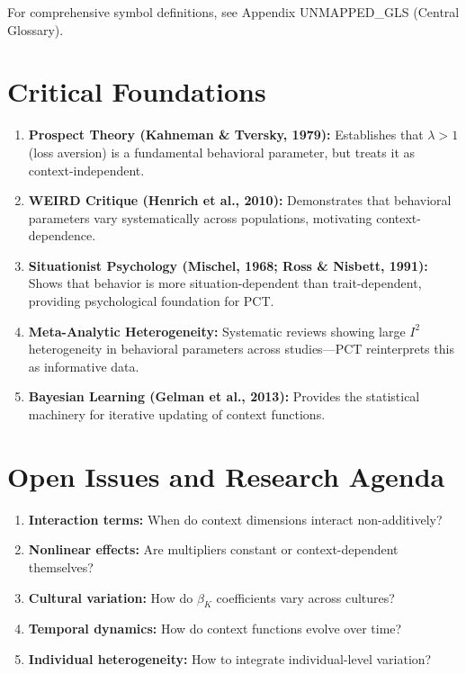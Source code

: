 For comprehensive symbol definitions, see Appendix UNMAPPED_GLS (Central Glossary).



\section{Critical Foundations}
\label{sec:pct-foundations}

\begin{enumerate}
    \item \textbf{Prospect Theory (Kahneman \& Tversky, 1979):} Establishes that
    $\lambda > 1$ (loss aversion) is a fundamental behavioral parameter, but treats
    it as context-independent.

    \item \textbf{WEIRD Critique (Henrich et al., 2010):} Demonstrates that behavioral
    parameters vary systematically across populations, motivating context-dependence.

    \item \textbf{Situationist Psychology (Mischel, 1968; Ross \& Nisbett, 1991):}
    Shows that behavior is more situation-dependent than trait-dependent, providing
    psychological foundation for PCT.

    \item \textbf{Meta-Analytic Heterogeneity:} Systematic reviews showing large
    $I^2$ heterogeneity in behavioral parameters across studies---PCT reinterprets
    this as informative data.

    \item \textbf{Bayesian Learning (Gelman et al., 2013):} Provides the statistical
    machinery for iterative updating of context functions.
\end{enumerate}



\section{Open Issues and Research Agenda}

\begin{enumerate}
    \item \textbf{Interaction terms:} When do context dimensions interact non-additively?
    \item \textbf{Nonlinear effects:} Are multipliers constant or context-dependent themselves?
    \item \textbf{Cultural variation:} How do $\beta_K$ coefficients vary across cultures?
    \item \textbf{Temporal dynamics:} How do context functions evolve over time?
    \item \textbf{Individual heterogeneity:} How to integrate individual-level variation?
\end{enumerate}


